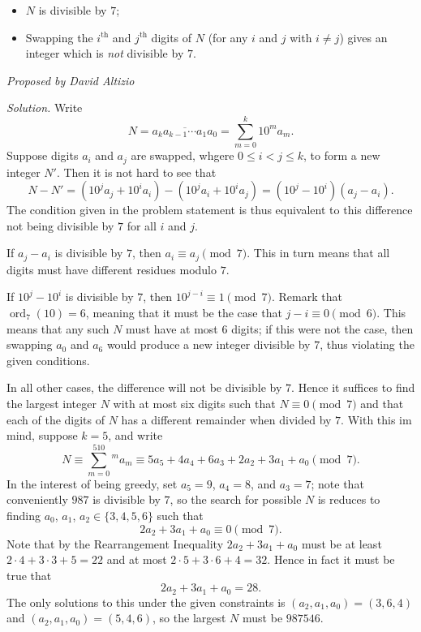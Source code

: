 \documentclass[10pt]{article}
\newcommand{\proposed}[1]
{
\vspace{5pt}
\noindent\textit{Proposed by #1}
}
\newcommand{\solution}
{
\vspace{5pt}
\noindent\textit{Solution.}\qquad
}
\begin{document}
\begin{enumerate}
\begin{itemize}
\item $N$ is divisible by $7$;

\item Swapping the $i^{\text{th}}$ and $j^{\text{th}}$ digits of $N$ (for any $i$ and $j$ with $i\neq j$) gives an integer which is \textit{not} divisible by $7$.

\end{itemize}

\proposed{David Altizio}

\solution Write \[N = \overline{a_ka_{k-1}\cdots a_1a_0} = \sum_{m=0}^k10^ma_m.\] Suppose digits $a_i$ and $a_j$ are swapped, whgere $0\leq i < j \leq k$, to form a new integer $N'$.  Then it is not hard to see that \[N - N' = \left(10^ja_j+10^ia_i\right)-\left(10^ja_i+10^ia_j\right) = \left(10^j-10^i\right)(a_j-a_i).\] The condition given in the problem statement is thus equivalent to this difference not being divisible by $7$ for all $i$ and $j$.

\par If $a_j-a_i$ is divisible by $7$, then $a_i\equiv a_j\pmod 7$.  This in turn means that all digits must have different residues modulo $7$.

\par If $10^j-10^i$ is divisible by $7$, then $10^{j-i}\equiv 1\pmod 7$.  Remark that $\operatorname{ord}_7(10) = 6$, meaning that it must be the case that $j-i\equiv 0\pmod 6$.  This means that any such $N$ must have at most $6$ digits; if this were not the case, then swapping $a_0$ and $a_6$ would produce a new integer divisible by $7$, thus violating the given conditions.

\par In all other cases, the difference will not be divisible by $7$.  Hence it suffices to find the largest integer $N$ with at most six digits such that $N\equiv 0\pmod 7$ and that each of the digits of $N$ has a different remainder when divided by $7$.  With this im mind, suppose $k=5$, and write \[N\equiv \sum_{m=0}^510^ma_m\equiv 5a_5+4a_4+6a_3+2a_2+3a_1+a_0\pmod 7.\] In the interest of being greedy, set $a_5=9$, $a_4=8$, and $a_3=7$; note that conveniently $987$ is divisible by $7$, so the search for possible $N$ is reduces to finding $a_0$, $a_1$, $a_2\in\{3,4,5,6\}$ such that \[2a_2+3a_1+a_0\equiv 0\pmod 7.\] Note that by the Rearrangement Inequality $2a_2+3a_1+a_0$ must be at least $2\cdot 4+3\cdot 3 + 5 = 22$ and at most $2\cdot 5 +3\cdot 6 + 4 = 32$.  Hence in fact it must be true that \[2a_2+3a_1+a_0 = 28.\] The only solutions to this under the given constraints is $(a_2,a_1,a_0)=(3,6,4)$ and $(a_2,a_1,a_0) = (5,4,6)$, so the largest $N$ must be $\boxed{987546}$. 


\end{enumerate}
\end{document}
